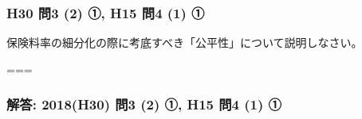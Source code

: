 \documentclass[
]{article}
\begin{document}
\hypertarget{h30-ux554f3-2-ux2460-h15-ux554f4-1-ux2460}{%
\subsubsection{H30 問3 (2) ①, H15 問4 (1)
①}\label{h30-ux554f3-2-ux2460-h15-ux554f4-1-ux2460}}

保険料率の細分化の際に考底すべき「公平性」について説明しなさい。

===

\hypertarget{ux89e3ux7b54-2018h30-ux554f3-2-ux2460-h15-ux554f4-1-ux2460}{%
\subsubsection{解答: 2018(H30) 問3 (2) ①, H15 問4 (1)
①}\label{ux89e3ux7b54-2018h30-ux554f3-2-ux2460-h15-ux554f4-1-ux2460}}
\end{document}
